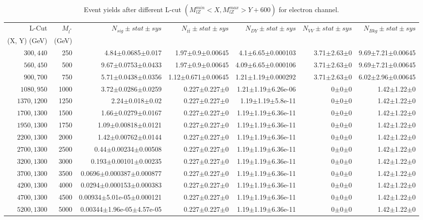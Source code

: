 \documentclass[]{article}
\begin{document}
\begin{table}
\begin{center}
\scriptsize{
\begin{tabular}{ |r|r|r|r|r|r|r|}
\hline 
L-Cut & $M_{l^*}$ & $N_{sig}\pm stat \pm sys $ &$N_{t\bar{t}}\pm stat \pm sys $ & $N_{DY}\pm stat \pm sys $ & $N_{VV}\pm stat \pm sys $ &$N_{Bkg}\pm stat \pm sys$\\
 (X, Y) (GeV) & (GeV) & && &&\\
\hline 
$300, 440$ & 250 & 4.84$\pm$0.0685$\pm$0.017 & 1.97$\pm$0.9$\pm$0.00645 & 4.1$\pm$6.65$\pm$0.000103 & 3.71$\pm$2.63$\pm$0 & 9.69$\pm$7.21$\pm$0.00645 \\
$560, 450$ & 500 & 9.67$\pm$0.0753$\pm$0.0433 & 1.97$\pm$0.9$\pm$0.00645 & 4.09$\pm$6.65$\pm$0.000106 & 3.71$\pm$2.63$\pm$0 & 9.69$\pm$7.21$\pm$0.00645 \\
$900, 700$ & 750 & 5.71$\pm$0.0438$\pm$0.0356 & 1.12$\pm$0.671$\pm$0.00645 & 1.21$\pm$1.19$\pm$0.000292 & 3.71$\pm$2.63$\pm$0 & 6.02$\pm$2.96$\pm$0.00645 \\
$1080,950$ & 1000 & 3.72$\pm$0.0286$\pm$0.0259 & 0.227$\pm$0.227$\pm$0 & 1.21$\pm$1.19$\pm$6.26e-06 & 0$\pm$0$\pm$0 & 1.42$\pm$1.22$\pm$0 \\
$1370,1200$ & 1250 & 2.24$\pm$0.018$\pm$0.02 & 0.227$\pm$0.227$\pm$0 & 1.19$\pm$1.19$\pm$5.8e-11 & 0$\pm$0$\pm$0 & 1.42$\pm$1.22$\pm$0 \\
$1700,1300$ & 1500 & 1.66$\pm$0.0279$\pm$0.0167 & 0.227$\pm$0.227$\pm$0 & 1.19$\pm$1.19$\pm$6.36e-11 & 0$\pm$0$\pm$0 & 1.42$\pm$1.22$\pm$0 \\
$1950,1300$ & 1750 & 1.09$\pm$0.00818$\pm$0.0121 & 0.227$\pm$0.227$\pm$0 & 1.19$\pm$1.19$\pm$6.36e-11 & 0$\pm$0$\pm$0 & 1.42$\pm$1.22$\pm$0 \\
$2200,1300$ & 2000 & 1.42$\pm$0.00762$\pm$0.0144 & 0.227$\pm$0.227$\pm$0 & 1.19$\pm$1.19$\pm$6.36e-11 & 0$\pm$0$\pm$0 & 1.42$\pm$1.22$\pm$0 \\
$2700,1300$ & 2500 & 0.44$\pm$0.00234$\pm$0.00508 & 0.227$\pm$0.227$\pm$0 & 1.19$\pm$1.19$\pm$6.36e-11 & 0$\pm$0$\pm$0 & 1.42$\pm$1.22$\pm$0 \\
$3200,1300$ & 3000 & 0.193$\pm$0.00101$\pm$0.00235 & 0.227$\pm$0.227$\pm$0 & 1.19$\pm$1.19$\pm$6.36e-11 & 0$\pm$0$\pm$0 & 1.42$\pm$1.22$\pm$0 \\
$3700,1300$ & 3500 & 0.0696$\pm$0.000387$\pm$0.000877 & 0.227$\pm$0.227$\pm$0 & 1.19$\pm$1.19$\pm$6.36e-11 & 0$\pm$0$\pm$0 & 1.42$\pm$1.22$\pm$0 \\
$4200,1300$ & 4000 & 0.0294$\pm$0.000153$\pm$0.000383 & 0.227$\pm$0.227$\pm$0 & 1.19$\pm$1.19$\pm$6.36e-11 & 0$\pm$0$\pm$0 & 1.42$\pm$1.22$\pm$0 \\
$4700,1300$ & 4500 & 0.00934$\pm$5.01e-05$\pm$0.000121 & 0.227$\pm$0.227$\pm$0 & 1.19$\pm$1.19$\pm$6.36e-11 & 0$\pm$0$\pm$0 & 1.42$\pm$1.22$\pm$0 \\
$5200,1300$ & 5000 & 0.00344$\pm$1.96e-05$\pm$4.57e-05 & 0.227$\pm$0.227$\pm$0 & 1.19$\pm$1.19$\pm$6.36e-11 & 0$\pm$0$\pm$0 & 1.42$\pm$1.22$\pm$0 \\
\hline 
\end{tabular}
}
\end{center}
\caption{Event yields after different L-cut $(M_{lZ}^{min} < X, M_{lZ}^{max} > Y + 600)$ for electron channel.}
\end{table}
\end{document}
